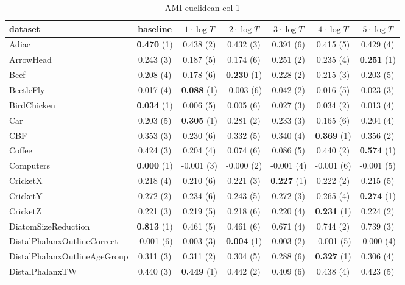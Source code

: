     \begin{table}[ht]
    \caption{AMI euclidean col 1} 
    \begin{adjustbox}{width=\textwidth}
    \begin{tabular}{lcccccc}
    \hline
    dataset & baseline & \textbf{$1\cdot \log{T}$} & \textbf{$2\cdot \log{T}$} & \textbf{$3\cdot \log{T}$} & \textbf{$4\cdot \log{T}$} & \textbf{$5\cdot \log{T}$} \\ \hline
    Adiac & \textbf{0.470} (1) & 0.438 (2) & 0.432 (3) & 0.391 (6) & 0.415 (5) & 0.429 (4) \\
    ArrowHead & 0.243 (3) & 0.187 (5) & 0.174 (6) & 0.251 (2) & 0.235 (4) & \textbf{0.251} (1) \\
    Beef & 0.208 (4) & 0.178 (6) & \textbf{0.230} (1) & 0.228 (2) & 0.215 (3) & 0.203 (5) \\
    BeetleFly & 0.017 (4) & \textbf{0.088} (1) & -0.003 (6) & 0.042 (2) & 0.016 (5) & 0.023 (3) \\
    BirdChicken & \textbf{0.034} (1) & 0.006 (5) & 0.005 (6) & 0.027 (3) & 0.034 (2) & 0.013 (4) \\
    Car & 0.203 (5) & \textbf{0.305} (1) & 0.281 (2) & 0.233 (3) & 0.165 (6) & 0.204 (4) \\
    CBF & 0.353 (3) & 0.230 (6) & 0.332 (5) & 0.340 (4) & \textbf{0.369} (1) & 0.356 (2) \\
    Coffee & 0.424 (3) & 0.204 (4) & 0.074 (6) & 0.086 (5) & 0.440 (2) & \textbf{0.574} (1) \\
    Computers & \textbf{0.000} (1) & -0.001 (3) & -0.000 (2) & -0.001 (4) & -0.001 (6) & -0.001 (5) \\
    CricketX & 0.218 (4) & 0.210 (6) & 0.221 (3) & \textbf{0.227} (1) & 0.222 (2) & 0.215 (5) \\
    CricketY & 0.272 (2) & 0.234 (6) & 0.243 (5) & 0.272 (3) & 0.265 (4) & \textbf{0.274} (1) \\
    CricketZ & 0.221 (3) & 0.219 (5) & 0.218 (6) & 0.220 (4) & \textbf{0.231} (1) & 0.224 (2) \\
    DiatomSizeReduction & \textbf{0.813} (1) & 0.461 (5) & 0.461 (6) & 0.671 (4) & 0.744 (2) & 0.739 (3) \\
    DistalPhalanxOutlineCorrect & -0.001 (6) & 0.003 (3) & \textbf{0.004} (1) & 0.003 (2) & -0.001 (5) & -0.000 (4) \\
    DistalPhalanxOutlineAgeGroup & 0.311 (3) & 0.311 (2) & 0.304 (5) & 0.288 (6) & \textbf{0.327} (1) & 0.306 (4) \\
    DistalPhalanxTW & 0.440 (3) & \textbf{0.449} (1) & 0.442 (2) & 0.409 (6) & 0.438 (4) & 0.423 (5) \\

\end{tabular}
\end{adjustbox}
\end{table}
